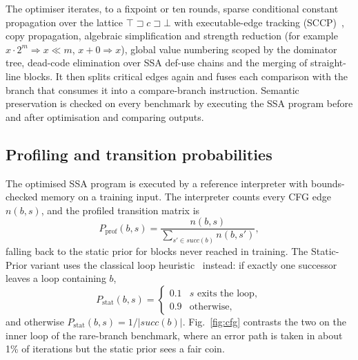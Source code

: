 \documentclass{ieeeaccess}
\begin{document}
The optimiser iterates, to a fixpoint or ten rounds, sparse conditional
constant propagation over the lattice
$\top \sqsupset c \sqsupset \bot$ with executable-edge tracking
(SCCP)~\cite{wegman1991sccp}, copy propagation, algebraic simplification
and strength reduction (for example $x\cdot 2^m\Rightarrow x\ll m$,
$x+0\Rightarrow x$), global value numbering scoped by the dominator
tree, dead-code elimination over SSA def-use chains and the merging of
straight-line blocks. It then splits critical edges again and fuses
each comparison with the branch that consumes it into a compare-branch
instruction. Semantic preservation is checked on every benchmark by
executing the SSA program before and after optimisation and comparing
outputs.

\subsection{Profiling and transition probabilities}

The optimised SSA program is executed by a reference interpreter with
bounds-checked memory on a training input. The interpreter counts every
CFG edge $n(b,s)$, and the profiled transition matrix is
\begin{equation}
P_{\mathrm{prof}}(b,s)=\frac{n(b,s)}{\sum_{s'\in\mathit{succ}(b)} n(b,s')},
\label{eq:pprof}
\end{equation}
falling back to the static prior for blocks never reached in training.
The Static-Prior variant uses the classical loop heuristic~\cite{wu1994}
instead: if exactly one successor leaves a loop containing $b$,
\begin{equation}
P_{\mathrm{stat}}(b,s)=\begin{cases}
0.1 & s \text{ exits the loop},\\
0.9 & \text{otherwise},
\end{cases}
\label{eq:pstat}
\end{equation}
and otherwise $P_{\mathrm{stat}}(b,s)=1/|\mathit{succ}(b)|$.
Fig.~\ref{fig:cfg} contrasts the two on the inner loop of the
rare-branch benchmark, where an error path is taken in about 1\% of
iterations but the static prior sees a fair coin.
\end{document}
